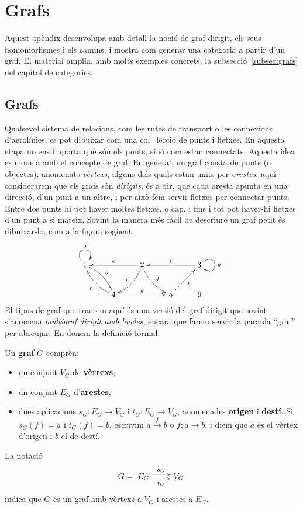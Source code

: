 \chapter{Grafs}\label{cap:grafs}

Aquest apèndix desenvolupa amb detall la noció de graf dirigit, els seus homomorfismes i els camins, i mostra com generar una categoria a partir d'un graf. El material amplia, amb molts exemples concrets, la subsecció~\ref{subsec:grafs} del capítol de categories.

\section{Grafs}

Qualsevol sistema de relacions, com les rutes de transport o les connexions d'aerolínies, es pot dibuixar com una col·lecció de punts i fletxes. En aquesta etapa no ens importa què són els punts, sinó com estan connectats. Aquesta idea es modela amb el concepte de graf. En general, un graf consta de punts (o objectes), anomenats \emph{vèrtexs}, alguns dels quals estan units per \emph{arestes}; aquí considerarem que els grafs són \emph{dirigits}, és a dir, que cada aresta apunta en una direcció, d'un punt a un altre, i per això fem servir fletxes per connectar punts. Entre dos punts hi pot haver moltes fletxes, o cap, i fins i tot pot haver-hi fletxes d'un punt a si mateix. Sovint la manera més fàcil de descriure un graf petit és dibuixar-lo, com a la figura següent.
\begin{equation}\label{graf:1}
\xymatrix{
1 \ar@(ul,ur)[]^a \ar@/^/[dr]^b
& & 2 \ar@/^/[dl]_c \ar@/_/[dr]^d \ar[ll]_e
& & 3 \ar[ll]_f \ar@(ur,dr)[]^g \\
& 4 \ar@/^/[ul]^h \ar[rr]^k
& & 5 \ar[ur]_l & 6
}
\end{equation}
El tipus de graf que tractem aquí és una versió del graf dirigit que sovint s'anomena \emph{multigraf dirigit amb bucles}, encara que farem servir la paraula \enquote{graf} per abreujar. En donem la definició formal.

\begin{definicio}
Un \textbf{graf} $G$ comprèn:
\begin{itemize}
\item un conjunt $V_G$ de \textbf{vèrtexs};
\item un conjunt $E_G$ d'\textbf{arestes};
\item dues aplicacions $s_G\colon E_G\to V_G$ i $t_G\colon E_G\to V_G$, anomenades \textbf{origen} i \textbf{destí}. Si $s_G(f)=a$ i $t_G(f)=b$, escrivim $a\xrightarrow{f}b$ o $f\colon a\to b$, i diem que $a$ és el vèrtex d'origen i $b$ el de destí.
\end{itemize}
La notació
\[
G=\xymatrix{
E_G \ar@<0.6ex>[r]^{s_G} \ar@<-0.6ex>[r]_{t_G} & V_G
}
\]
indica que $G$ és un graf amb vèrtexs a $V_G$ i arestes a $E_G$.
\end{definicio}

